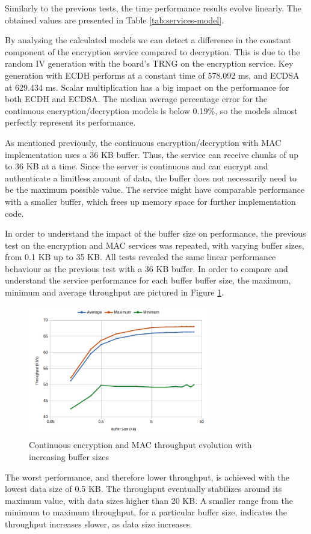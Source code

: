 Similarly to the previous tests, the time performance results evolve linearly. The obtained values are presented in Table \ref{tab:services-model}.


By analysing the calculated models we can detect a difference in the constant component of the encryption service compared to decryption. This is due to the random IV generation with the board's TRNG on the encryption service.
Key generation with ECDH performs at a constant time of 578.092 ms, and ECDSA at 629.434 ms.
Scalar multiplication has a big impact on the performance for both ECDH and ECDSA.
The median average percentage error for the continuous encryption/decryption models is below 0.19\%, so the models almost perfectly represent its performance.%

As mentioned previously, the continuous encryption/decryption with MAC implementation uses a 36 KB buffer. Thus, the service can receive chunks of up to 36 KB at a time.
Since the server is continuous and can encrypt and authenticate a limitless amount of data, the buffer does not necessarily need to be the maximum possible value. The service might have comparable performance with a smaller buffer, which frees up memory space for further implementation code.

In order to understand the impact of the buffer size on performance, the previous test on the encryption and MAC services was repeated, with varying buffer sizes, from 0.1 KB up to 35 KB.
All tests revealed the same linear performance behaviour as the previous test with a 36 KB buffer. In order to compare and understand the service performance for each buffer buffer size, the maximum, minimum and average throughput are pictured in Figure \ref{fig:performance:buffer-tput}.
\begin{figure}[h!]
	\centering
	\includegraphics[width=0.7\textwidth]{./Images/buffer-tput.png}
	\caption{Continuous encryption and MAC throughput evolution with increasing buffer sizes}
	\label{fig:performance:buffer-tput}
\end{figure}
The worst performance, and therefore lower throughput, is achieved with the lowest data size of 0.5 KB. The throughput eventually stabilizes around its maximum value, with data sizes higher than 20 KB.
A smaller range from the minimum to maximum throughput, for a particular buffer size, indicates the throughput increases slower, as data size increases.

